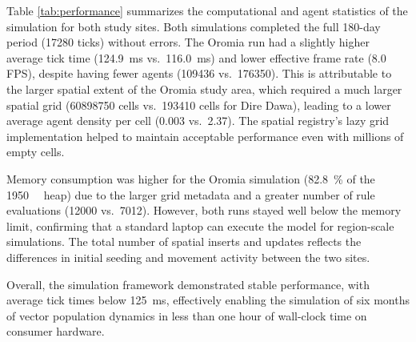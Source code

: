 \documentclass{article}
\begin{document}
\newpage
\par
Table \ref{tab:performance} summarizes the computational and agent statistics of the simulation for both study sites.
Both simulations completed the full 180-day period (\num{17280} ticks) without errors. The Oromia run had a slightly higher 
average tick time (\SI{124.9}{\milli\second} vs.\ \SI{116.0}{\milli\second}) and lower effective frame rate (\num{8.0} FPS), 
despite having fewer agents (\num{109436} vs.\ \num{176350}). This is attributable to the larger spatial extent of the Oromia 
study area, which required a much larger spatial grid (\num{60898750} cells vs.\ \num{193410} cells for Dire Dawa), leading to 
a lower average agent density per cell (\num{0.003} vs.\ \num{2.37}). The spatial registry's lazy grid implementation helped 
to maintain acceptable performance even with millions of empty cells.
\par
Memory consumption was higher for the Oromia simulation (\SI{82.8}{\percent} of the \SI{1950}{\mega\byte} heap) due to the 
larger grid metadata and a greater number of rule evaluations (\num{12000} vs.\ \num{7012}). However, both runs stayed well 
below the memory limit, confirming that a standard laptop can execute the model for region-scale simulations. The total number 
of spatial inserts and updates reflects the differences in initial seeding and movement activity between the two sites.
\par
Overall, the simulation framework demonstrated stable performance, with average tick times below \SI{125}{\milli\second}, 
effectively enabling the simulation of six months of vector population dynamics in less than one hour of wall-clock time 
on consumer hardware.
\end{document}
